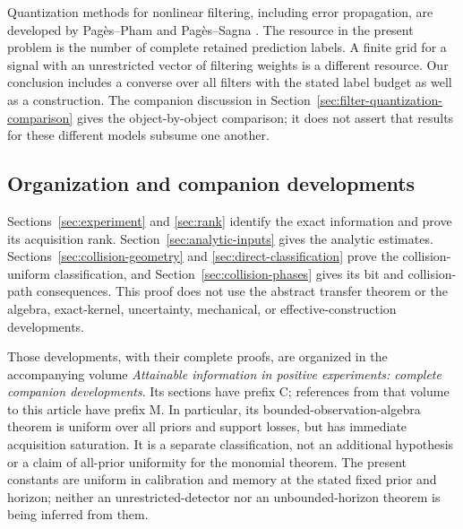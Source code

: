 Quantization methods for nonlinear filtering, including error
propagation, are developed by Pag\`es--Pham \cite{PagesPham2005} and
Pag\`es--Sagna \cite{PagesSagna2018}. The resource in the present
problem is the number of complete retained prediction labels. A
finite grid for a signal with an unrestricted vector of filtering
weights is a different resource. Our conclusion includes a converse
over all filters with the stated label budget as well as a
construction. The companion discussion in
Section~\ref{sec:filter-quantization-comparison} gives the
object-by-object comparison; it does not assert that results for
these different models subsume one another.

\subsection{Organization and companion developments}
Sections~\ref{sec:experiment} and \ref{sec:rank} identify the exact
information and prove its acquisition rank. Section~\ref{sec:analytic-inputs}
gives the analytic estimates. Sections~\ref{sec:collision-geometry}
and \ref{sec:direct-classification} prove the collision-uniform
classification, and Section~\ref{sec:collision-phases} gives its
bit and collision-path consequences. This proof does not use the
abstract transfer theorem or the algebra, exact-kernel, uncertainty,
mechanical, or effective-construction developments.

Those developments, with their complete proofs, are organized in the
accompanying volume \emph{Attainable information in positive experiments:
complete companion developments}. Its sections have prefix C;
references from that volume to this article have prefix M. In
particular, its bounded-observation-algebra theorem is uniform over
all priors and support losses, but has immediate acquisition saturation.
It is a separate classification, not an additional hypothesis or a
claim of all-prior uniformity for the monomial theorem. The present
constants are uniform in calibration and memory at the stated fixed
prior and horizon; neither an unrestricted-detector nor an
unbounded-horizon theorem is being inferred from them.
